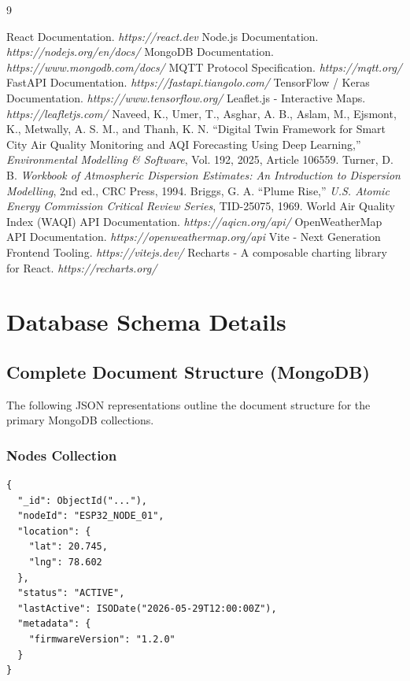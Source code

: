 \documentclass[a4paper, 12pt]{report}
\begin{document}
\begin{thebibliography}{9}
React Documentation. 
\textit{https://react.dev}
Node.js Documentation. 
\textit{https://nodejs.org/en/docs/}
MongoDB Documentation. 
\textit{https://www.mongodb.com/docs/}
MQTT Protocol Specification. 
\textit{https://mqtt.org/}
FastAPI Documentation. 
\textit{https://fastapi.tiangolo.com/}
TensorFlow / Keras Documentation. 
\textit{https://www.tensorflow.org/}
Leaflet.js - Interactive Maps. 
\textit{https://leafletjs.com/}
Naveed, K., Umer, T., Asghar, A. B., Aslam, M., Ejsmont, K.,
Metwally, A. S. M., and Thanh, K. N.
``Digital Twin Framework for Smart City Air Quality Monitoring and AQI Forecasting Using Deep Learning,''
\textit{Environmental Modelling \& Software},
Vol. 192, 2025, Article 106559.
Turner, D. B.
\textit{Workbook of Atmospheric Dispersion Estimates: An Introduction to Dispersion Modelling},
2nd ed., CRC Press, 1994.
Briggs, G. A.
``Plume Rise,''
\textit{U.S. Atomic Energy Commission Critical Review Series},
TID-25075, 1969.
World Air Quality Index (WAQI) API Documentation.
\textit{https://aqicn.org/api/}
OpenWeatherMap API Documentation.
\textit{https://openweathermap.org/api}
Vite - Next Generation Frontend Tooling.
\textit{https://vitejs.dev/}
Recharts - A composable charting library for React.
\textit{https://recharts.org/}
\end{thebibliography}
\appendix 
{}
\chapter{Database Schema Details}
\section{Complete Document Structure (MongoDB)}
The following JSON representations outline the document structure for the primary MongoDB collections.
\subsection*{Nodes Collection}
\begin{verbatim}
{
  "_id": ObjectId("..."),
  "nodeId": "ESP32_NODE_01",
  "location": {
    "lat": 20.745,
    "lng": 78.602
  },
  "status": "ACTIVE",
  "lastActive": ISODate("2026-05-29T12:00:00Z"),
  "metadata": {
    "firmwareVersion": "1.2.0"
  }
}
\end{verbatim}
\end{document}
